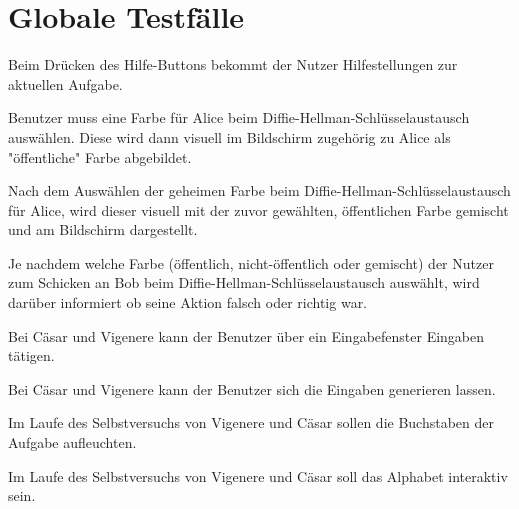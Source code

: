 \documentclass{article}
\begin{document}
\section{Globale Testfälle}
\begin{T}[start = 10]
\item Beim Drücken des Hilfe-Buttons bekommt der Nutzer Hilfestellungen zur aktuellen Aufgabe.
\end{T}

\begin{T}[start = 20]
 \item Benutzer muss eine Farbe für Alice beim Diffie-Hellman-Schlüsselaustausch auswählen. Diese wird dann visuell im Bildschirm zugehörig zu Alice als "öffentliche" Farbe abgebildet.
\end{T}

\begin{T}[start = 30]
 \item Nach dem Auswählen der geheimen Farbe beim Diffie-Hellman-Schlüsselaustausch für Alice, wird dieser visuell mit der zuvor gewählten, öffentlichen Farbe gemischt und am Bildschirm dargestellt.
\end{T}

\begin{T}[start = 40]
 \item Je nachdem welche Farbe (öffentlich, nicht-öffentlich oder gemischt) der Nutzer zum Schicken an Bob beim Diffie-Hellman-Schlüsselaustausch auswählt, wird darüber informiert ob seine Aktion falsch oder richtig war.
\end{T}

\begin{T}[start = 50]
 \item Bei Cäsar und Vigenere kann der Benutzer über ein Eingabefenster Eingaben tätigen.
\end{T}

\begin{T}[start = 60]
 \item Bei Cäsar und Vigenere kann der Benutzer sich die Eingaben generieren lassen.
\end{T}

\begin{T}[start = 70]
 \item Im Laufe des Selbstversuchs von Vigenere und Cäsar sollen die Buchstaben der Aufgabe aufleuchten.
\end{T}

\begin{T}[start = 80]
 \item Im Laufe des Selbstversuchs von Vigenere und Cäsar soll das Alphabet interaktiv sein.
\end{T}
\end{document}

